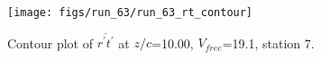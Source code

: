 \begin{figure}[H]
\centering
\texttt{[image: figs/run\_63/run\_63\_rt\_contour]}
\caption{Contour plot of $\overline{r^\prime t^\prime}$ at $z/c$=10.00, $V_{free}$=19.1, station 7.}
\label{fig:run_63_rt_contour}
\end{figure}


